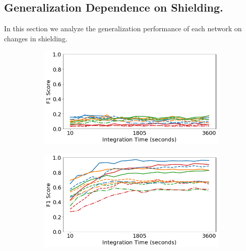 \subsection{Generalization Dependence on Shielding.}

In this section we analyze the generalization performance of each network on changes in shielding.



\begin{figure}[H]
     \centering
     \begin{subfigure}[b]{0.49\textwidth}
         \centering
         \includegraphics[width=\textwidth]{images/generalization-shielding-easy-01.png}
         \caption{}
         \label{fig:generalization-shielding-easy-01}
     \end{subfigure}
     \hfill
     \begin{subfigure}[b]{0.49\textwidth}
         \centering
         \includegraphics[width=\textwidth]{images/generalization-shielding-easy-05.png}
         \caption{}
         \label{fig:generalization-shielding-easy-05}
     \end{subfigure}


\end{figure}
